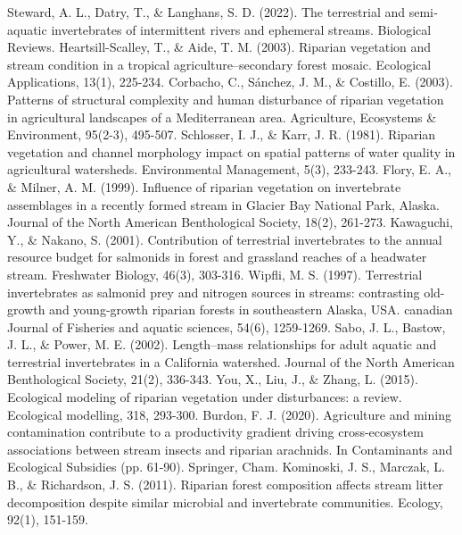 \documentclass[12pt]{article}
\numberwithin{equation}{section}
\begin{document}
\begin{thebibliography}{99}
  Steward, A. L., Datry, T., \& Langhans, S. D. (2022). The terrestrial and semi‐aquatic invertebrates of intermittent rivers and ephemeral streams. Biological Reviews.
  Heartsill-Scalley, T., \& Aide, T. M. (2003). Riparian vegetation and stream condition in a tropical agriculture–secondary forest mosaic. Ecological Applications, 13(1), 225-234.
  Corbacho, C., Sánchez, J. M., \& Costillo, E. (2003). Patterns of structural complexity and human disturbance of riparian vegetation in agricultural landscapes of a Mediterranean area. Agriculture, Ecosystems \& Environment, 95(2-3), 495-507.
  Schlosser, I. J., \& Karr, J. R. (1981). Riparian vegetation and channel morphology impact on spatial patterns of water quality in agricultural watersheds. Environmental Management, 5(3), 233-243.
Flory, E. A., \& Milner, A. M. (1999). Influence of riparian vegetation on invertebrate assemblages in a recently formed stream in Glacier Bay National Park, Alaska. Journal of the North American Benthological Society, 18(2), 261-273.
  Kawaguchi, Y., \& Nakano, S. (2001). Contribution of terrestrial invertebrates to the annual resource budget for salmonids in forest and grassland reaches of a headwater stream. Freshwater Biology, 46(3), 303-316.
  Wipfli, M. S. (1997). Terrestrial invertebrates as salmonid prey and nitrogen sources in streams: contrasting old-growth and young-growth riparian forests in southeastern Alaska, USA. canadian Journal of Fisheries and aquatic sciences, 54(6), 1259-1269.
  Sabo, J. L., Bastow, J. L., \& Power, M. E. (2002). Length–mass relationships for adult aquatic and terrestrial invertebrates in a California watershed. Journal of the North American Benthological Society, 21(2), 336-343.
  You, X., Liu, J., \& Zhang, L. (2015). Ecological modeling of riparian vegetation under disturbances: a review. Ecological modelling, 318, 293-300.
  Burdon, F. J. (2020). Agriculture and mining contamination contribute to a productivity gradient driving cross-ecosystem associations between stream insects and riparian arachnids. In Contaminants and Ecological Subsidies (pp. 61-90). Springer, Cham.
  Kominoski, J. S., Marczak, L. B., \& Richardson, J. S. (2011). Riparian forest composition affects stream litter decomposition despite similar microbial and invertebrate communities. Ecology, 92(1), 151-159.

\end{thebibliography}
\end{document}
